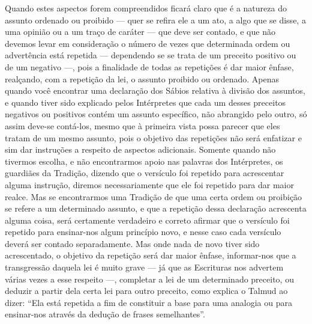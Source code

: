 Quando estes aspectos forem compreendidos ficará claro que é a natureza
do assunto ordenado ou proibido --- quer se refira ele a um ato, a algo
que se disse, a uma opinião ou a um traço de caráter --- que deve ser
contado, e que não devemos levar em consideração o número de vezes que
determinada ordem ou advertência está repetida --- dependendo se se
trata de um preceito positivo ou de um negativo ---, pois a finalidade
de todas as repetições é dar maior ênfase, realçando, com a repetição da
lei, o assunto proibido ou ordenado. Apenas quando você encontrar uma
declaração dos Sábios relativa à divisão dos assuntos, e quando tiver
sido explicado pelos Intérpretes que cada um desses preceitos negativos
ou positivos contém um assunto específico, não abrangido pelo outro, só
assim deve-se contá-los, mesmo que à primeira vista possa parecer que
eles tratam de um mesmo assunto, pois o objetivo das repetições não
será enfatizar e sim dar instruções a respeito de aspectos adicionais.
Somente quando não tivermos escolha, e não encontrarmos apoio nas
palavras dos Intérpretes, os guardiães da Tradição, dizendo que o
versículo foi repetido para acrescentar alguma instrução, diremos
necessariamente que ele foi repetido para dar maior realce. Mas se
encontrarmos uma Tradição de que uma certa ordem ou proibição se refere
a um determinado assunto, e que a repetição dessa declaração acrescenta
alguma coisa, será certamente verdadeiro e correto afirmar que o
versículo foi repetido para ensinar-nos algum princípio novo, e nesse
caso cada versículo deverá ser contado separadamente. Mas onde nada de
novo tiver sido acrescentado, o objetivo da repetição será dar maior
ênfase, informar-nos que a transgressão daquela lei é muito grave --- já
que as Escrituras nos advertem várias vezes a esse respeito ---,
completar a lei de um determinado preceito, ou deduzir a partir dela
certa lei para outro preceito, como explica o Talmud ao dizer: ``Ela
está repetida a fim de constituir a base para uma analogia ou para
ensinar-nos através da dedução de frases semelhantes''.

